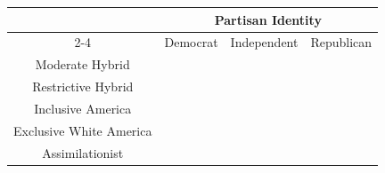 \begin{table}[t]
\fontsize{12.0pt}{14.0pt}\selectfont
\begin{tabular*}{\linewidth}{@{\extracolsep{\fill}}cccc}
\toprule
 & \multicolumn{3}{c}{{Partisan Identity}} \\ 
\cmidrule(lr){2-4}
 & Democrat & Independent & Republican \\ 
\midrule\addlinespace[2.5pt]
Moderate Hybrid & {\cellcolor[HTML]{4589BA}{\textcolor[HTML]{FFFFFF}{0.32}}} & {\cellcolor[HTML]{8158A6}{\textcolor[HTML]{FFFFFF}{0.33}}} & {\cellcolor[HTML]{C56574}{\textcolor[HTML]{FFFFFF}{0.30}}} \\ 
Restrictive Hybrid & {\cellcolor[HTML]{79AFD6}{\textcolor[HTML]{000000}{0.21}}} & {\cellcolor[HTML]{9F7EBF}{\textcolor[HTML]{FFFFFF}{0.24}}} & {\cellcolor[HTML]{CE7A86}{\textcolor[HTML]{FFFFFF}{0.25}}} \\ 
Inclusive America & {\cellcolor[HTML]{98C0E1}{\textcolor[HTML]{000000}{0.16}}} & {\cellcolor[HTML]{B196CD}{\textcolor[HTML]{FFFFFF}{0.19}}} & {\cellcolor[HTML]{EAC1C7}{\textcolor[HTML]{000000}{0.12}}} \\ 
Exclusive White America & {\cellcolor[HTML]{AFCDE8}{\textcolor[HTML]{000000}{0.13}}} & {\cellcolor[HTML]{CBB9DE}{\textcolor[HTML]{000000}{0.12}}} & {\cellcolor[HTML]{D9969F}{\textcolor[HTML]{000000}{0.20}}} \\ 
Assimilationist & {\cellcolor[HTML]{90BCDE}{\textcolor[HTML]{000000}{0.17}}} & {\cellcolor[HTML]{CCBBDF}{\textcolor[HTML]{000000}{0.12}}} & {\cellcolor[HTML]{E6B7BD}{\textcolor[HTML]{000000}{0.14}}} \\ 
\bottomrule
\end{tabular*}
\end{table}

